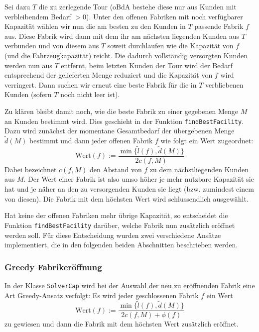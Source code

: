 \documentclass[a4paper,ngerman,11pt,bibtotoc]{scrartcl}
\theoremstyle{definition}
\theoremstyle{plain}
\theoremstyle{remark}
\begin{document}
	Sei dazu $T$ die zu zerlegende Tour (oBdA bestehe diese nur aus Kunden mit verbleibendem Bedarf $>0$). Unter den offenen Fabriken mit noch verfügbarer Kapazität wählen wir nun die \glqq am besten\grqq{} zu den Kunden in $T$ passende Fabrik $f$ aus. Diese Fabrik wird dann mit dem ihr am nächsten liegenden Kunden aus $T$ verbunden und von diesem aus $T$ soweit durchlaufen wie die Kapazität von $f$ (und die Fahrzeugkapazität) reicht. Die dadurch vollständig versorgten Kunden werden nun aus $T$ entfernt, beim letzten Kunden der Tour wird der Bedarf entsprechend der gelieferten Menge reduziert und die Kapazität von $f$ wird verringert. Dann suchen wir erneut eine \glqq beste Fabrik\grqq{} für die in $T$ verbliebenen Kunden (sofern $T$ noch nicht leer ist).
	
	Zu klären bleibt damit noch, wie die \glqq beste Fabrik\grqq{} zu einer gegebenen Menge $M$ an Kunden bestimmt wird. Dies geschieht in der Funktion \lstinline|findBestFacility|. Dazu wird zunächst der momentane Gesamtbedarf der übergebenen Menge $\tilde{d}(M)$ bestimmt und dann jeder offenen Fabrik $f$ wie folgt ein Wert zugeordnet:
	\[\text{Wert}(f) :=  \frac{\min\{\tilde{l}(f), \tilde{d}(M)\}}{2 c(f,M)}\]
	Dabei bezeichnet $c(f,M)$ den Abstand von $f$ zu dem nächstliegenden Kunden aus $M$. Der Wert einer Fabrik ist also umso höher je mehr nutzbare Kapazität sie hat und je näher an den zu versorgenden Kunden sie liegt (bzw. zumindest einem von diesen). Die Fabrik mit dem höchsten Wert wird schlussendlich ausgewählt.
	
	Hat keine der offenen Fabriken mehr übrige Kapazität, so entscheidet die Funktion \lstinline|findBestFacility| darüber, welche Fabrik nun zusätzlich eröffnet werden soll. Für diese Entscheidung wurden zwei verschiedene Ansätze implementiert, die in den folgenden beiden Abschnitten beschrieben werden.		

	\subsubsection{Greedy Fabrikeröffnung}
	
	In der Klasse \lstinline|SolverCap| wird bei der Auswahl der neu zu eröffnenden Fabrik eine Art Greedy-Ansatz verfolgt: Es wird jeder geschlossenen Fabrik $f$ ein Wert
	\[\text{Wert}(f) :=  \frac{\min\{\tilde{l}(f), \tilde{d}(M)\}}{2 c(f,M) + \phi(f)}\]
	zu gewiesen und dann die Fabrik mit dem höchsten Wert zusätzlich eröffnet.
	
\end{document}

